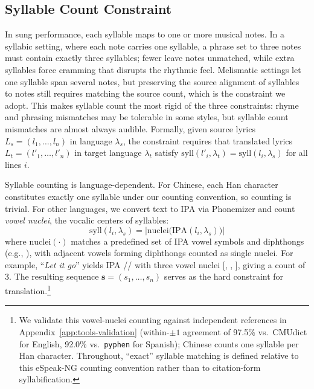 \documentclass[11pt]{article}
\begin{document}
\subsection{Syllable Count Constraint}
\label{sec:syllable-count}

In sung performance, each syllable maps to one or more musical notes.
In a syllabic setting, where each note carries one syllable, a phrase set to three notes must contain exactly three syllables; fewer leave notes unmatched, while extra syllables force cramming that disrupts the rhythmic feel. Melismatic settings let one syllable span several notes, but preserving the source alignment of syllables to notes still requires matching the source count, which is the constraint we adopt.
This makes syllable count the most rigid of the three constraints: rhyme and phrasing mismatches may be tolerable in some styles, but syllable count mismatches are almost always audible.
Formally, given source lyrics $L_s = (l_1, \ldots, l_n)$ in language $\lambda_s$, the constraint requires that translated lyrics $L_t = (l'_1, \ldots, l'_n)$ in target language $\lambda_t$ satisfy $\text{syll}(l'_i, \lambda_t) = \text{syll}(l_i, \lambda_s)$ for all lines $i$.

Syllable counting is language-dependent.
For Chinese, each Han character constitutes exactly one syllable under our counting convention, so counting is trivial.
For other languages, we convert text to IPA via Phonemizer \citep{bernard-titeux-2021-phonemizer} and count \emph{vowel nuclei}, the vocalic centers of syllables:
\begin{equation}
    \text{syll}(l_i, \lambda_s) = \big|\text{nuclei}\big(\text{IPA}(l_i, \lambda_s)\big)\big|
    \label{eq:syllcount}
\end{equation}
where $\text{nuclei}(\cdot)$ matches a predefined set of IPA vowel symbols and diphthongs (e.g., ), with adjacent vowels forming diphthongs counted as single nuclei.
For example, ``\emph{Let it go}'' yields IPA // with three vowel nuclei [, , ], giving a count of 3.
The resulting sequence $\mathbf{s} = (s_1, \ldots, s_n)$ serves as the hard constraint for translation.\footnote{We validate this vowel-nuclei counting against independent references in Appendix~\ref{app:tools-validation} (within-$\pm1$ agreement of 97.5\% vs.\ CMUdict for English, 92.0\% vs.\ \texttt{pyphen} for Spanish); Chinese counts one syllable per Han character. Throughout, ``exact'' syllable matching is defined relative to this eSpeak-NG counting convention rather than to citation-form syllabification.}
\end{document}
